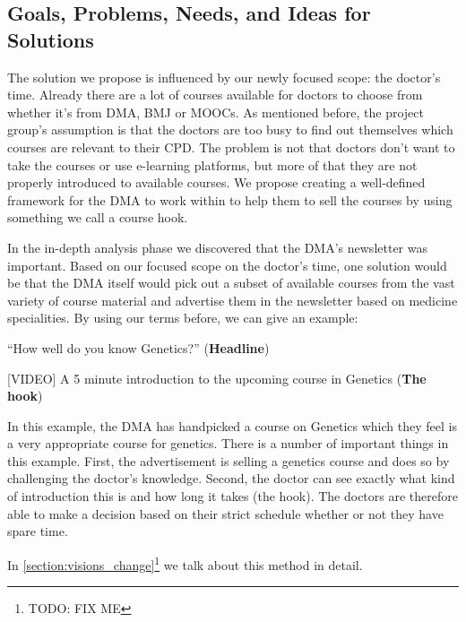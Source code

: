 \subsection{Goals, Problems, Needs, and Ideas for Solutions}

The solution we propose is influenced by our newly focused scope: the doctor’s time. Already there are a lot of courses available for doctors to choose from whether it’s from DMA, BMJ or MOOCs. As mentioned before, the project group’s assumption is that the doctors are too busy to find out themselves which courses are relevant to their CPD. The problem is not that doctors don’t want to take the courses or use e-learning platforms, but more of that they are not properly introduced to available courses. We propose creating a well-defined framework for the DMA to work within to help them to sell the courses by using something we call a course hook.

In the in-depth analysis phase we discovered that the DMA’s newsletter was important. Based on our focused scope on the doctor’s time, one solution would be that the DMA itself would pick out a subset of available courses from the vast variety of course material and advertise them in the newsletter based on medicine specialities. By using our terms before, we can give an example:


\begin{center}
“How well do you know Genetics?” (\textbf{Headline})

[VIDEO] A 5 minute introduction to the upcoming course in Genetics (\textbf{The hook})
\end{center}

In this example, the DMA has handpicked a course on Genetics which they feel is a very appropriate course for genetics. There is a number of important things in this example. First, the advertisement is selling a genetics course and does so by challenging the doctor’s knowledge. Second, the doctor can see exactly what kind of introduction this is and how long it takes (the hook). The doctors are therefore able to make a decision based on their strict schedule whether or not they have spare time.

In \ref{section:visions_change}\footnote{TODO: FIX ME} we talk about this method in detail.

